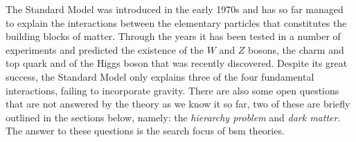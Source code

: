 The Standard Model was introduced in the early 1970s and has so far managed to
explain the interactions between the elementary particles that constitutes the
building blocks of matter. Through the years it has been tested in a number of
experiments and predicted the existence of the $W$ and $Z$ bosons, the charm and
top quark and of the Higgs boson that was recently discovered. Despite its great
success, the Standard Model only explains three of the four fundamental
interactions, failing to incorporate gravity. There are also some open questions
that are not answered by the theory as we know it so far, two of these are
briefly outlined in the sections below, namely: the \emph{hierarchy problem} and
\emph{dark matter}. The answer to these questions is the search focus of
\gls{bsm} theories.
